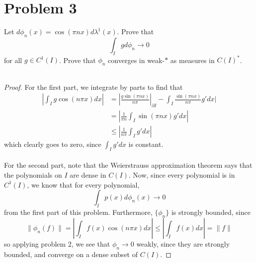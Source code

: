 \documentclass[fontsize=11pt]{scrartcl} %
\numberwithin{equation}{section} %
\numberwithin{figure}{section} %
\numberwithin{table}{section} %
\begin{document}
\section*{Problem 3}
Let $d\phi_n(x) = \cos(\pi n x)d\lambda^1(x)$. Prove that
\[
    \int_I gd\phi_n \to 0
\]
for all $g\in C^1(I)$. Prove that $\phi_n$ converges in weak-$*$ as measures in
$C(I)^*$.
\\
\\
\begin{proof}
    For the first part, we integrate by parts to find that
    \[
\begin{aligned}
    |\int_I g\cos(n\pi x)dx| &= |\frac{g\sin(\pi nx)}{n\pi}|_{\partial I} -
    \int_I \frac{\sin(\pi nx)}{n\pi}g'dx|\\
    &=|\frac{1}{\pi n}\int_I\sin(\pi nx)g'dx|\\
    &\leq |\frac{1}{n\pi}\int_I g'dx|
\end{aligned}
    \]
    which clearly goes to zero, since $\int_Ig'dx$ is constant.
    \\
    \\
    For the second part, note that the Weierstrauss approximation theorem says
    that the polynomials on $I$ are dense in $C(I)$. Now, since every polynomial
    is in $C^1(I)$, we know that for every polynomial,
    \[
        \int_Ip(x)d\phi_n(x) \to 0
    \]
    from the first part of this problem. Furthermore, $\{\phi_n\}$ is strongly
    bounded, since
    \[
        \|\phi_n(f)\| = |\int_If(x)\cos(n\pi x)dx| \leq |\int_I f(x)dx| = \|f\|
    \]
    so applying problem 2, we see that $\phi_n\to 0$ weakly, since they are
    strongly bounded, and converge on a dense subset of $C(I)$. 
\end{proof}
\end{document}
